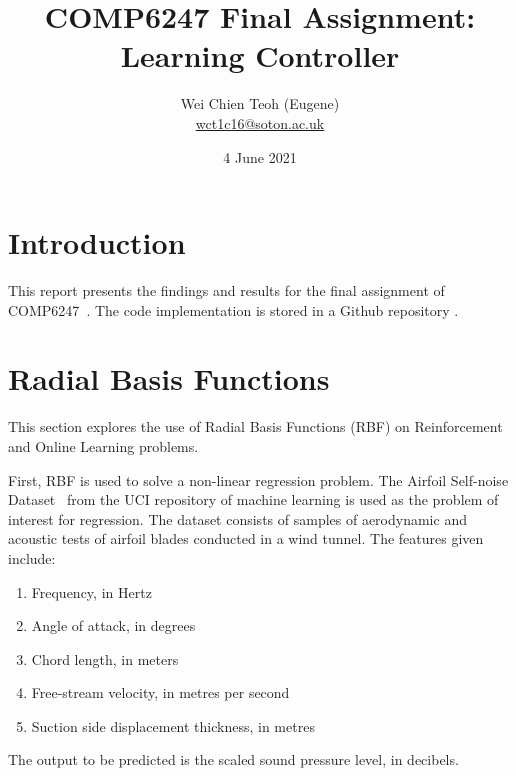 \documentclass{article}
\title{COMP6247 Final Assignment: Learning Controller}
\author{Wei Chien Teoh (Eugene)\\\bigskip \href{mailto:wct1c16@soton.ac.uk}{wct1c16@soton.ac.uk}}
\date{4 June 2021}
\begin{document}
\maketitle

\section{Introduction}

This report presents the findings and results for the final assignment of COMP6247~\cite{mahesanniranjanCOMP6247202021}. The code implementation is stored in a Github repository \cite{teohEugeneteohCOMP6247ReinforcementOnlineLearning2021}.

\section{Radial Basis Functions} \label{sec:rbf}

This section explores the use of Radial Basis Functions (RBF) on Reinforcement and Online Learning problems.

First, RBF is used to solve a non-linear regression problem. The Airfoil Self-noise Dataset~\cite{UCIMachineLearning} from the UCI repository of machine learning is used as the problem of interest for regression. The dataset consists of samples of aerodynamic and acoustic tests of airfoil blades conducted in a wind tunnel. The features given include:
\begin{enumerate}
    \item Frequency, in Hertz
    \item Angle of attack, in degrees
    \item Chord length, in meters
    \item Free-stream velocity, in metres per second
    \item Suction side displacement thickness, in metres
\end{enumerate}
The output to be predicted is the scaled sound pressure level, in decibels.
\end{document}
